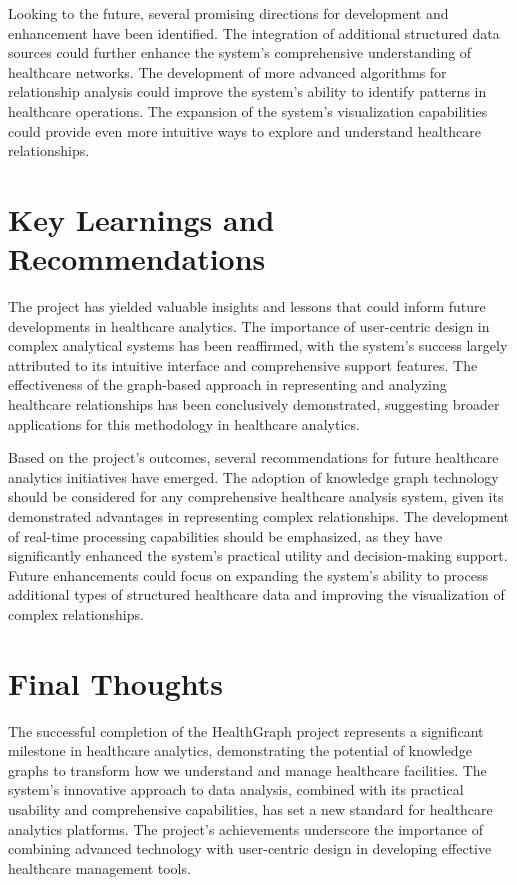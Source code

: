 \documentclass[12pt,a4paper]{report}
\begin{document}
Looking to the future, several promising directions for development and enhancement have been identified. The integration of additional structured data sources could further enhance the system's comprehensive understanding of healthcare networks. The development of more advanced algorithms for relationship analysis could improve the system's ability to identify patterns in healthcare operations. The expansion of the system's visualization capabilities could provide even more intuitive ways to explore and understand healthcare relationships.

\section{Key Learnings and Recommendations}
The project has yielded valuable insights and lessons that could inform future developments in healthcare analytics. The importance of user-centric design in complex analytical systems has been reaffirmed, with the system's success largely attributed to its intuitive interface and comprehensive support features. The effectiveness of the graph-based approach in representing and analyzing healthcare relationships has been conclusively demonstrated, suggesting broader applications for this methodology in healthcare analytics.

Based on the project's outcomes, several recommendations for future healthcare analytics initiatives have emerged. The adoption of knowledge graph technology should be considered for any comprehensive healthcare analysis system, given its demonstrated advantages in representing complex relationships. The development of real-time processing capabilities should be emphasized, as they have significantly enhanced the system's practical utility and decision-making support. Future enhancements could focus on expanding the system's ability to process additional types of structured healthcare data and improving the visualization of complex relationships.

\section{Final Thoughts}
The successful completion of the HealthGraph project represents a significant milestone in healthcare analytics, demonstrating the potential of knowledge graphs to transform how we understand and manage healthcare facilities. The system's innovative approach to data analysis, combined with its practical usability and comprehensive capabilities, has set a new standard for healthcare analytics platforms. The project's achievements underscore the importance of combining advanced technology with user-centric design in developing effective healthcare management tools.
\end{document}
